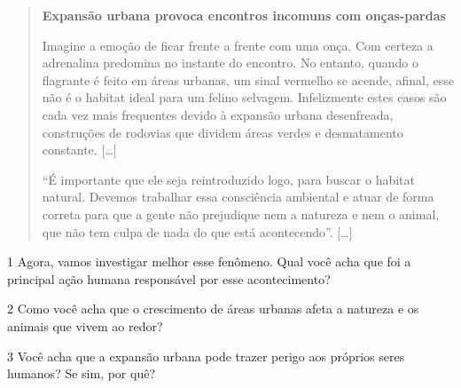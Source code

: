 \begin{quote}
\textbf{Expansão urbana provoca encontros incomuns com onças-pardas}

Imagine a emoção de ficar frente a frente com uma onça. Com certeza a
adrenalina predomina no instante do encontro. No entanto, quando o
flagrante é feito em áreas urbanas, um sinal vermelho se acende, afinal,
esse não é o habitat ideal para um felino selvagem. Infelizmente estes
casos são cada vez mais frequentes devido à expansão urbana desenfreada,
construções de rodovias que dividem áreas verdes e desmatamento
constante. {[}\ldots{}{]}

“É importante que ele seja reintroduzido logo, para buscar o habitat
natural. Devemos trabalhar essa consciência ambiental e atuar de forma
correta para que a gente não prejudique nem a natureza e nem o animal,
que não tem culpa de nada do que está acontecendo”. {[}\ldots{}{]}

\end{quote}

\num{1} Agora, vamos investigar melhor esse fenômeno. Qual você acha que foi a principal ação humana responsável por esse acontecimento?


\num{2} Como você acha que o crescimento de áreas urbanas afeta a natureza e os
animais que vivem ao redor?


\num{3} Você acha que a expansão urbana pode trazer perigo aos próprios seres
humanos? Se sim, por quê?


\pagebreak
{}

